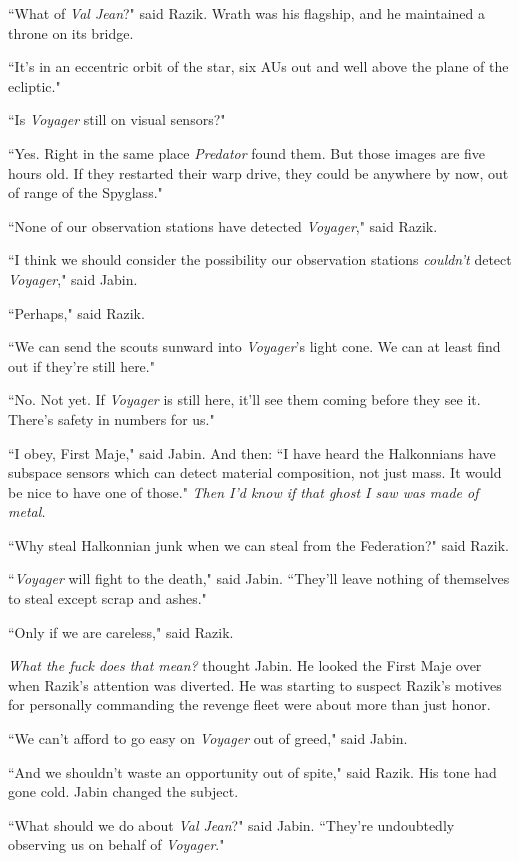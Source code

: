 \documentclass[twoside,letterpaper,12pt]{memoir}
\begin{document}
``What of \textit{Val Jean}?" said Razik. Wrath was his flagship, and he maintained a throne on its bridge.

``It's in an eccentric orbit of the star, six AUs out and well above the plane of the ecliptic."

``Is \textit{Voyager} still on visual sensors?"

``Yes. Right in the same place \textit{Predator} found them. But those images are five hours old. If they restarted their warp drive, they could be anywhere by now, out of range of the Spyglass."

``None of our observation stations have detected \textit{Voyager}," said Razik.

``I think we should consider the possibility our observation stations \textit{couldn't} detect \textit{Voyager}," said Jabin.

``Perhaps," said Razik.

``We can send the scouts sunward into \textit{Voyager}'s light cone. We can at least find out if they're still here."

``No. Not yet. If \textit{Voyager} is still here, it'll see them coming before they see it. There's safety in numbers for us."

``I obey, First Maje," said Jabin. And then: ``I have heard the Halkonnians have subspace sensors which can detect material composition, not just mass. It would be nice to have one of those." \textit{Then I’d know if that ghost I saw was made of metal.}

``Why steal Halkonnian junk when we can steal from the Federation?" said Razik.

``\textit{Voyager} will fight to the death," said Jabin. ``They'll leave nothing of themselves to steal except scrap and ashes."

``Only if we are careless," said Razik.

\textit{What the fuck does that mean?} thought Jabin. He looked the First Maje over when Razik's attention was diverted. He was starting to suspect Razik's motives for personally commanding the revenge fleet were about more than just honor.

``We can't afford to go easy on \textit{Voyager} out of greed," said Jabin.

``And we shouldn't waste an opportunity out of spite," said Razik. His tone had gone cold. Jabin changed the subject.

``What should we do about \textit{Val Jean}?" said Jabin. ``They're undoubtedly observing us on behalf of \textit{Voyager}."
\end{document}
